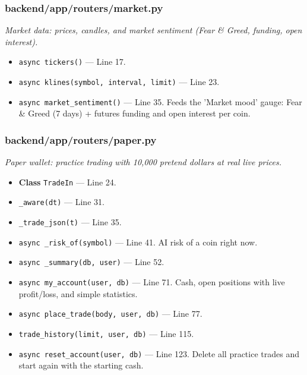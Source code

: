 \subsubsection*{backend/app/routers/market.py}
\textit{Market data: prices, candles, and market sentiment (Fear \& Greed, funding, open interest).}
\begin{itemize}[nosep,leftmargin=1.5em]
\item \texttt{async tickers(\allowbreak{})} --- Line 17.
\item \texttt{async klines(\allowbreak{}symbol,\allowbreak{} interval,\allowbreak{} limit)} --- Line 23.
\item \texttt{async market\_\allowbreak{}sentiment(\allowbreak{})} --- Line 35. Feeds the 'Market mood' gauge: Fear \& Greed (7 days) + futures funding and open interest per coin.
\end{itemize}
\subsubsection*{backend/app/routers/paper.py}
\textit{Paper wallet: practice trading with 10,000 pretend dollars at real live prices.}
\begin{itemize}[nosep,leftmargin=1.5em]
\item \textbf{Class} \texttt{TradeIn} --- Line 24.
\item \texttt{\_\allowbreak{}aware(\allowbreak{}dt)} --- Line 31.
\item \texttt{\_\allowbreak{}trade\_\allowbreak{}json(\allowbreak{}t)} --- Line 35.
\item \texttt{async \_\allowbreak{}risk\_\allowbreak{}of(\allowbreak{}symbol)} --- Line 41. AI risk of a coin right now.
\item \texttt{async \_\allowbreak{}summary(\allowbreak{}db,\allowbreak{} user)} --- Line 52.
\item \texttt{async my\_\allowbreak{}account(\allowbreak{}user,\allowbreak{} db)} --- Line 71. Cash, open positions with live profit/loss, and simple statistics.
\item \texttt{async place\_\allowbreak{}trade(\allowbreak{}body,\allowbreak{} user,\allowbreak{} db)} --- Line 77.
\item \texttt{trade\_\allowbreak{}history(\allowbreak{}limit,\allowbreak{} user,\allowbreak{} db)} --- Line 115.
\item \texttt{async reset\_\allowbreak{}account(\allowbreak{}user,\allowbreak{} db)} --- Line 123. Delete all practice trades and start again with the starting cash.
\end{itemize}
